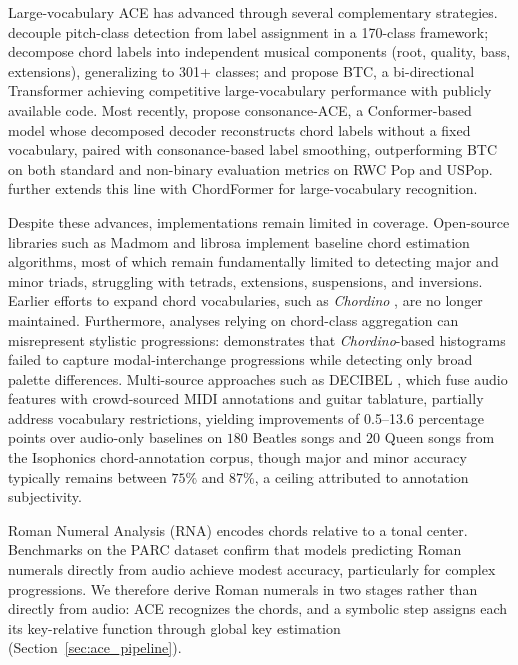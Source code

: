 \documentclass{article}
\newcommand{\rev}[1]{{\color{r2}#1}} %
\begin{document}
Large-vocabulary ACE has advanced through several complementary strategies. \citet{mcfee2017structured} decouple pitch-class detection from label assignment in a 170-class framework; \citet{jiang2019large} decompose chord labels into independent musical components (root, quality, bass, extensions), generalizing to 301+ classes; and \citet{park2019bi} propose BTC, a bi-directional Transformer achieving competitive large-vocabulary performance with publicly available code. Most recently, \citet{poltronieri2025discord} propose consonance-ACE, a Conformer-based model whose decomposed decoder reconstructs chord labels without a fixed vocabulary, paired with consonance-based label smoothing, outperforming BTC on both standard and non-binary evaluation metrics on RWC Pop and USPop. \citet{waseem2025chordformer} further extends this line with ChordFormer for large-vocabulary recognition.

Despite these advances, implementations remain limited in coverage. Open-source libraries such as Madmom \citep{bock2016madmom} and librosa \citep{mcfee2025librosa} \rev{implement} baseline chord estimation algorithms, most of which remain fundamentally limited to detecting major and minor triads, struggling with tetrads, extensions, suspensions, and inversions. Earlier efforts to expand chord vocabularies, such as \textit{Chordino} \citep{mauch2010approximate}, \rev{are no longer maintained}. Furthermore, analyses relying on chord-class aggregation can misrepresent stylistic progressions: \citet{collins2025recording} demonstrates that \textit{Chordino}-based histograms failed to capture modal-interchange progressions while detecting only broad palette differences. Multi-source approaches such as DECIBEL \citep{odekerken2020decibel}, which fuse audio features with crowd-sourced MIDI annotations and guitar tablature, partially address vocabulary restrictions, yielding improvements of 0.5--13.6 percentage points over audio-only baselines on $180$ Beatles songs and $20$ Queen songs from the Isophonics chord-annotation corpus, though major and minor accuracy typically remains between $75\%$ and $87\%$, a ceiling attributed to annotation subjectivity.

Roman Numeral Analysis (RNA) encodes chords relative to a tonal center. Benchmarks on the PARC dataset \citep{poppe2025polyphonic} confirm that \rev{models predicting Roman numerals directly from audio} achieve modest accuracy, particularly for complex progressions. \rev{We therefore derive Roman numerals in two stages rather than directly from audio: ACE recognizes the chords, and a symbolic step assigns each its key-relative function through global key estimation (Section~\ref{sec:ace_pipeline}).}
\end{document}
